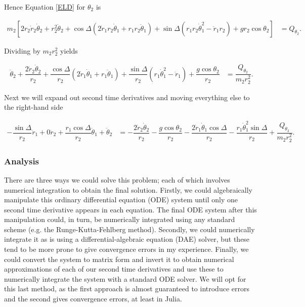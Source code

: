 \documentclass[12pt,a4paper,portrait]{article}
\newcommand{\eq}[1]{Equation \eqref{#1}}
\begin{document}
\begin{landscape}
Hence \eq{ELD} for $\theta_2$ is

\begin{align*}
	m_2\left[2r_2\dot{r}_2\dot{\theta}_2 + r_2^2\ddot{\theta}_2 +\cos{\Delta}(2\dot{r}_1r_2\dot{\theta}_1+r_1r_2\ddot{\theta}_1)+\sin{\Delta}(r_1r_2\dot{\theta}_1^2-\ddot{r}_1r_2) + gr_2\cos{\theta_2}\right] &= Q_{\theta_2}.
\end{align*}

Dividing by $m_2r_2^2$ yields

\begin{align*}
	\ddot{\theta}_2 + \dfrac{2\dot{r}_2\dot{\theta}_2}{r_2} + \dfrac{\cos{\Delta}}{r_2} (2\dot{r}_1\dot{\theta}_1+r_1\ddot{\theta}_1)+\dfrac{\sin{\Delta}}{r_2}(r_1\dot{\theta}_1^2-\ddot{r}_1) + \dfrac{g\cos{\theta_2}}{r_2} &= \dfrac{Q_{\theta_2}}{m_2r_2^2}.
\end{align*}

Next we will expand out second time derivatives and moving everything else to the right-hand side

\begin{align*}
	-\dfrac{\sin{\Delta}}{r_2}\ddot{r}_1 + 0\ddot{r}_2 + \dfrac{r_1\cos{\Delta}}{r_2}\ddot{\theta}_1 + \ddot{\theta}_2 &= -\dfrac{2\dot{r}_2\dot{\theta}_2}{r_2} - \dfrac{g\cos{\theta_2}}{r_2} - \dfrac{2\dot{r}_1\dot{\theta}_1\cos{\Delta}}{r_2}-\dfrac{r_1\dot{\theta}_1^2\sin{\Delta}}{r_2} + \dfrac{Q_{\theta_2}}{m_2r_2^2}.
\end{align*}
\subsubsection{Analysis}
There are three ways we could solve this problem; each of which involves numerical integration to obtain the final solution. Firstly, we could algebraically manipulate this ordinary differential equation (ODE) system until only one second time derivative appears in each equation. The final ODE system after this manipulation could, in turn, be numerically integrated using any standard scheme (e.g. the Runge-Kutta-Fehlberg method). Secondly, we could numerically integrate it as is using a differential-algebraic equation (DAE) solver, but these tend to be more prone to give convergence errors in my experience. Finally, we could convert the system to matrix form and invert it to obtain numerical approximations of each of our second time derivatives and use these to numerically integrate the system with a standard ODE solver. We will opt for this last method, as the first approach is almost guaranteed to introduce errors and the second gives convergence errors, at least in Julia. 


\end{landscape}
\end{document}
